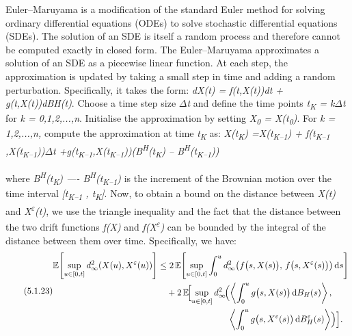 \documentclass[12pt,a4paper]{report}
\numberwithin{equation}{section}
\begin{document}
Euler--Maruyama is a modification of the standard Euler method for
solving ordinary differential equations (ODEs) to solve stochastic
differential equations (SDEs). The solution of an SDE is itself a random
process and therefore cannot be computed exactly in closed form. The
Euler--Maruyama approximates a solution of an SDE as a piecewise linear
function. At each step, the approximation is updated by taking a small
step in time and adding a random perturbation. Specifically, it takes
the form: \emph{dX(t) = f(t,X(t))dt + g(t,X(t))dBH(t)}. Choose a time
step size \emph{$\Delta$t} and define the time points \emph{t\textsubscript{K}
= k$\Delta$t} for \emph{k = 0,1,2,...,n}. Initialise the approximation by
setting \emph{X\textsubscript{0} = X(t\textsubscript{0})}. For \emph{k
= 1,2,...,n,} compute the approximation at time
\emph{t\textsubscript{K}} as: \emph{X(t\textsubscript{K})
=X(t\textsubscript{K--1}) + f(t\textsubscript{K--1}
,X(t\textsubscript{K--1}))$\Delta$t
+g(t\textsubscript{K--1},X(t\textsubscript{K--1}))(B\textsuperscript{H}(t\textsubscript{K})
-- B\textsuperscript{H}(t\textsubscript{K--1}))}

where \emph{B\textsuperscript{H}(t\textsubscript{K}) ----
B\textsuperscript{H}(t\textsubscript{K--1})} is the increment of the
Brownian motion over the time interval \emph{{[}t\textsubscript{K--1} ,
t\textsubscript{K}{]}}. Now, to obtain a bound on the distance between
\emph{X(t)} and \emph{X\textsuperscript{$\varepsilon$}(t)}, we use the triangle
inequality and the fact that the distance between the two drift
functions \emph{f(X)} and \emph{f(X\textsuperscript{$\varepsilon$})} can be bounded
by the integral of the distance between them over time. Specifically, we
have:
\begin{equation}\tag{5.1.23}\label{eq:5.1.23}
\begin{aligned}
\mathbb{E}\!\left[\sup_{u\in[0,t]} d_{\infty}^{2}\!\left(X(u),X^{\varepsilon}(u)\right)\right]
&\le 2\,\mathbb{E}\!\left[\sup_{u\in[0,t]}
\int_{0}^{u} d_{\infty}^{2}\!\left(
f\bigl(s,X(s)\bigr),\,f\bigl(s,X^{\varepsilon}(s)\bigr)
\right)\mathrm{d}s\right] \\
&\quad + 2\,\mathbb{E}\!\Bigl[\sup_{u\in[0,t]}
d_{\infty}^{2}\!\Bigl(
\left\langle\int_{0}^{u} g\bigl(s,X(s)\bigr)\,\mathrm{d}B_{H}(s)\right\rangle, \\
&\qquad\qquad\qquad\qquad
\left\langle\int_{0}^{u} g\bigl(s,X^{\varepsilon}(s)\bigr)\,\mathrm{d}B_{H}^{\varepsilon}(s)\right\rangle
\Bigr)\Bigr].
\end{aligned}
\end{equation}
\end{document}

